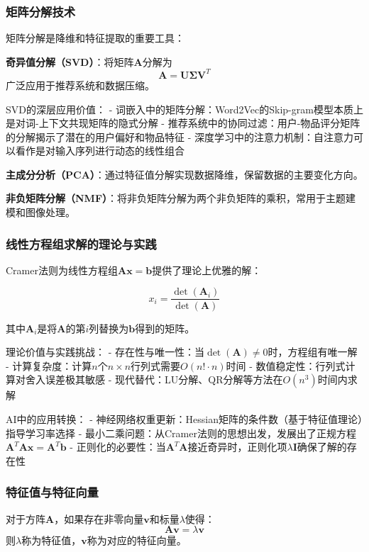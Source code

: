 \subsubsection{矩阵分解技术}
矩阵分解是降维和特征提取的重要工具：

\textbf{奇异值分解（SVD）}：将矩阵$\mathbf{A}$分解为
$$\mathbf{A} = \mathbf{U}\mathbf{\Sigma}\mathbf{V}^T$$
广泛应用于推荐系统和数据压缩。

SVD的深层应用价值：
- 词嵌入中的矩阵分解：Word2Vec的Skip-gram模型本质上是对词-上下文共现矩阵的隐式分解
- 推荐系统中的协同过滤：用户-物品评分矩阵的分解揭示了潜在的用户偏好和物品特征
- 深度学习中的注意力机制：自注意力可以看作是对输入序列进行动态的线性组合

\textbf{主成分分析（PCA）}：通过特征值分解实现数据降维，保留数据的主要变化方向。

\textbf{非负矩阵分解（NMF）}：将非负矩阵分解为两个非负矩阵的乘积，常用于主题建模和图像处理。

\subsubsection{线性方程组求解的理论与实践}

Cramer法则为线性方程组$\mathbf{A}\mathbf{x} = \mathbf{b}$提供了理论上优雅的解：

$$x_i = \frac{\det(\mathbf{A}_i)}{\det(\mathbf{A})}$$

其中$\mathbf{A}_i$是将$\mathbf{A}$的第$i$列替换为$\mathbf{b}$得到的矩阵。

理论价值与实践挑战：
- 存在性与唯一性：当$\det(\mathbf{A}) \neq 0$时，方程组有唯一解
- 计算复杂度：计算$n$个$n \times n$行列式需要$O(n! \cdot n)$时间
- 数值稳定性：行列式计算对舍入误差极其敏感
- 现代替代：LU分解、QR分解等方法在$O(n^3)$时间内求解

AI中的应用转换：
- 神经网络权重更新：Hessian矩阵的条件数（基于特征值理论）指导学习率选择
- 最小二乘问题：从Cramer法则的思想出发，发展出了正规方程$\mathbf{A}^T\mathbf{A}\mathbf{x} = \mathbf{A}^T\mathbf{b}$
- 正则化的必要性：当$\mathbf{A}^T\mathbf{A}$接近奇异时，正则化项$\lambda\mathbf{I}$确保了解的存在性

\subsubsection{特征值与特征向量}
对于方阵$\mathbf{A}$，如果存在非零向量$\mathbf{v}$和标量$\lambda$使得：
$$\mathbf{A}\mathbf{v} = \lambda\mathbf{v}$$
则$\lambda$称为特征值，$\mathbf{v}$称为对应的特征向量。

